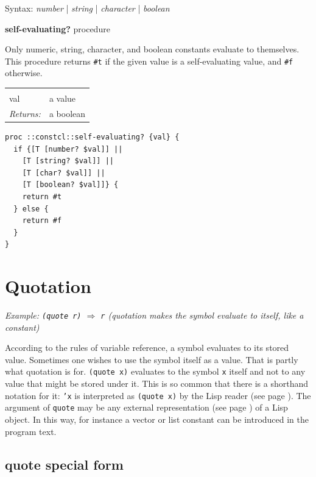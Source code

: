 \documentclass[twoside]{report}
\begin{document}
Syntax: \emph{number} | \emph{string} | \emph{character} | \emph{boolean}

\textbf{self-evaluating?} procedure

Only numeric, string, character, and boolean constants evaluate to themselves. This procedure returns \texttt{\#t} if the given value is a self-evaluating value, and \texttt{\#f} otherwise.

\noindent\begin{tabular}{ |p{1.9cm} p{8cm}| }
\hline
\rowcolor[HTML]{CCCCCC} \multicolumn{2}{|l|}{\bf self-evaluating? (internal)} \\
val & a value \\
\textit{Returns:} & a boolean \\
\hline
\end{tabular}

\begin{lstlisting}
proc ::constcl::self-evaluating? {val} {
  if {[T [number? $val]] ||
    [T [string? $val]] ||
    [T [char? $val]] ||
    [T [boolean? $val]]} {
    return #t
  } else {
    return #f
  }
}
\end{lstlisting}

\section{Quotation}
\label{quotation}

\emph{Example: \texttt{(quote r)} $\Rightarrow$ \texttt{r} (quotation makes the symbol evaluate to itself, like a constant)}

According to the rules of variable reference, a symbol evaluates to its stored value. Sometimes one wishes to use the symbol itself as a value. That is partly what quotation is for. \texttt{(quote x)} evaluates to the symbol \texttt{x} itself and not to any value that might be stored under it. This is so common that there is a shorthand notation for it: \texttt{'x} is interpreted as \texttt{(quote x)} by the Lisp reader (see page \pageref{reader-procedures}). The argument of \texttt{quote} may be any external representation (see page \pageref{external-representation}) of a Lisp object. In this way, for instance a vector or list constant can be introduced in the program text.

\subsection{quote special form}
\label{quote-special-form}
\end{document}

